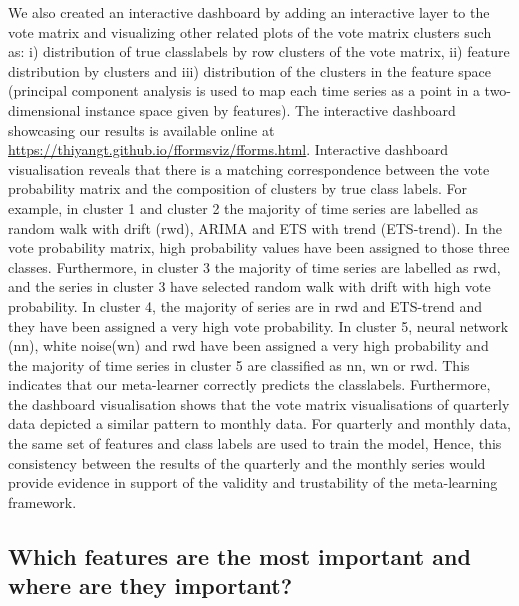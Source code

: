 \documentclass[11pt,a4paper,]{article}
\begin{document}
We also created an interactive dashboard by adding an interactive layer to the vote matrix and visualizing other related plots of the vote matrix clusters such as: i) distribution of true classlabels by row clusters of the vote matrix, ii) feature distribution by clusters and iii) distribution of the clusters in the feature space (principal component analysis is used to map each time series as a point in a two-dimensional instance space given by features). The interactive dashboard showcasing our results is available online at \url{https://thiyangt.github.io/fformsviz/fforms.html}. Interactive dashboard visualisation reveals that there is a matching correspondence between the vote probability matrix and the composition of clusters by true class labels. For example, in cluster 1 and cluster 2 the majority of time series are labelled as random walk with drift (rwd), ARIMA and ETS with trend (ETS-trend). In the vote probability matrix, high probability values have been assigned to those three classes. Furthermore, in cluster 3 the majority of time series are labelled as rwd, and the series in cluster 3 have selected random walk with drift with high vote probability. In cluster 4, the majority of series are in rwd and ETS-trend and they have been assigned a very high vote probability. In cluster 5, neural network (nn), white noise(wn) and rwd have been assigned a very high probability and the majority of time series in cluster 5 are classified as nn, wn or rwd. This indicates that our meta-learner correctly predicts the classlabels. Furthermore, the dashboard visualisation shows that the vote matrix visualisations of quarterly data depicted a similar pattern to monthly data. For quarterly and monthly data, the same set of features and class labels are used to train the model, Hence, this consistency between the results of the quarterly and the monthly series would provide evidence in support of the validity and trustability of the meta-learning framework.

\hypertarget{which-features-are-the-most-important-and-where-are-they-important}{%
\subsection{Which features are the most important and where are they important?}\label{which-features-are-the-most-important-and-where-are-they-important}}
\end{document}
